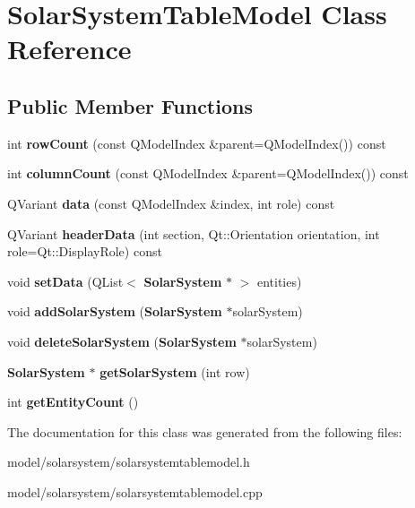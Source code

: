 \section{\-Solar\-System\-Table\-Model \-Class \-Reference}
\label{dc/d37/classSolarSystemTableModel}
\subsection*{\-Public \-Member \-Functions}
\begin{DoxyCompactItemize}
\item 
int {\bfseries row\-Count} (const \-Q\-Model\-Index \&parent=\-Q\-Model\-Index()) const \label{dc/d37/classSolarSystemTableModel_a72917602c0d7fc4d59efec3dc5c34121}

\item 
int {\bfseries column\-Count} (const \-Q\-Model\-Index \&parent=\-Q\-Model\-Index()) const \label{dc/d37/classSolarSystemTableModel_a9b5c7dcbada0ef855863fef50733de98}

\item 
\-Q\-Variant {\bfseries data} (const \-Q\-Model\-Index \&index, int role) const \label{dc/d37/classSolarSystemTableModel_a6e706c80d315c4e57519dea4ac6bbeea}

\item 
\-Q\-Variant {\bfseries header\-Data} (int section, \-Qt\-::\-Orientation orientation, int role=\-Qt\-::\-Display\-Role) const \label{dc/d37/classSolarSystemTableModel_ab6f41e0affc9a36a3bdfa41bc6e91a79}

\item 
void {\bfseries set\-Data} (\-Q\-List$<$ {\bf \-Solar\-System} $\ast$ $>$ entities)\label{dc/d37/classSolarSystemTableModel_ac5072386a5b96ace8a13d6aba6c94a82}

\item 
void {\bfseries add\-Solar\-System} ({\bf \-Solar\-System} $\ast$solar\-System)\label{dc/d37/classSolarSystemTableModel_a042c3754415bb1663496b80f677ac339}

\item 
void {\bfseries delete\-Solar\-System} ({\bf \-Solar\-System} $\ast$solar\-System)\label{dc/d37/classSolarSystemTableModel_aa4822a831ab30e1baf05f6cb815f83c7}

\item 
{\bf \-Solar\-System} $\ast$ {\bfseries get\-Solar\-System} (int row)\label{dc/d37/classSolarSystemTableModel_afe336ebf6069f087400edc501bfd1e68}

\item 
int {\bfseries get\-Entity\-Count} ()\label{dc/d37/classSolarSystemTableModel_aaa3593e268ef42ef4b0e705ce29697ed}

\end{DoxyCompactItemize}


\-The documentation for this class was generated from the following files\-:\begin{DoxyCompactItemize}
\item 
model/solarsystem/solarsystemtablemodel.\-h\item 
model/solarsystem/solarsystemtablemodel.\-cpp\end{DoxyCompactItemize}
